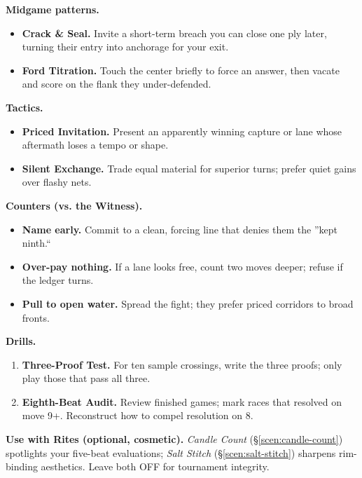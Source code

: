 \documentclass[11pt]{article}
\numberwithin{equation}{section} %
\theoremstyle{plain} %
\theoremstyle{definition} %
\theoremstyle{remark} %
\begin{document}
\medskip
\noindent\textbf{Midgame patterns.}
\begin{itemize}\setlength\itemsep{0.25em}
  \item \textbf{Crack \& Seal.} Invite a short-term breach you can close one ply later, turning their entry into anchorage for your exit.
  \item \textbf{Ford Titration.} Touch the center briefly to force an answer, then vacate and score on the flank they under-defended.
\end{itemize}

\medskip
\noindent\textbf{Tactics.}
\begin{itemize}\setlength\itemsep{0.25em}
  \item \textbf{Priced Invitation.} Present an apparently winning capture or lane whose aftermath loses a tempo or shape.
  \item \textbf{Silent Exchange.} Trade equal material for superior turns; prefer quiet gains over flashy nets.
\end{itemize}

\medskip
\noindent\textbf{Counters (vs. the Witness).}
\begin{itemize}\setlength\itemsep{0.25em}
  \item \textbf{Name early.} Commit to a clean, forcing line that denies them the ''kept ninth.``
  \item \textbf{Over-pay nothing.} If a lane looks free, count two moves deeper; refuse if the ledger turns.
  \item \textbf{Pull to open water.} Spread the fight; they prefer priced corridors to broad fronts.
\end{itemize}

\medskip
\noindent\textbf{Drills.}
\begin{enumerate}\setlength\itemsep{0.25em}
  \item \textbf{Three-Proof Test.} For ten sample crossings, write the three proofs; only play those that pass all three.
  \item \textbf{Eighth-Beat Audit.} Review finished games; mark races that resolved on move 9+. Reconstruct how to compel resolution on 8.
\end{enumerate}

\medskip
\noindent\textbf{Use with Rites (optional, cosmetic).} \emph{Candle Count} (\S\ref{scen:candle-count}) spotlights your five-beat evaluations; \emph{Salt Stitch} (\S\ref{scen:salt-stitch}) sharpens rim-binding aesthetics. Leave both \textsc{OFF} for tournament integrity.
\end{document}
